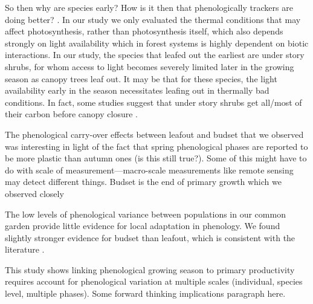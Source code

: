 \documentclass[12 pt]{article}
\begin{document}
So then why are species early? How is it then that phenologically trackers are doing better? \citep{}. In our study we only evaluated the thermal conditions that may affect photosynthesis, rather than photosynthesis itself, which also depends strongly on light availability which in forest systems is highly dependent on biotic interactions. In our study, the species that leafed out the earliest are under story shrubs, for whom access to light becomes severely limited later in the growing season as canopy trees leaf out. It may be that for these species, the light availability early in the season necessitates leafing out in thermally bad conditions. In fact, some studies suggest that under story shrubs get all/most of their carbon before canopy closure \citep{}.

The phenological carry-over effects between leafout and budset that we observed was interesting in light of the fact that spring phenological phases are reported to be more plastic than autumn ones (is this still true?). Some of this might have to do with scale of measurement---macro-scale measurements like remote sensing may detect different things. Budset is the end of primary growth which we observed closely   

The low levels of phenological variance between populations in our common garden provide little evidence for local adaptation in phenology. We found slightly stronger evidence for budset than leafout, which is consistent with the literature \citep{}. 

 This study shows linking phenological growing season to primary productivity requires account for phenological variation at multiple scales (individual, species level, multiple phases). Some forward thinking implications paragraph here.
\end{document}
